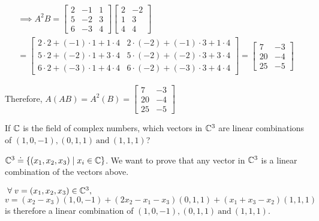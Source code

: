 \documentclass[a4paper, 11pt]{article}
\begin{document}
\begin{solution}
    \begin{multline*}
        \implies A^2B = \left[\begin{array}{ccc}
                2 & -1 & 1 \\
                5 & -2 & 3 \\
                6 & -3 & 4
            \end{array}\right]\left[\begin{array}{cc}
                2 & -2 \\
                1 & 3  \\
                4 & 4
            \end{array}\right]
        \\
        = \left[\begin{array}{cc}
                2 \cdot 2 + (-1) \cdot 1 + 1 \cdot 4 & 2 \cdot (-2) + (-1) \cdot 3 + 1 \cdot 4 \\
                5 \cdot 2 + (-2) \cdot 1 + 3 \cdot 4 & 5 \cdot (-2) + (-2) \cdot 3 + 3 \cdot 4 \\
                6 \cdot 2 + (-3) \cdot 1 + 4 \cdot 4 & 6 \cdot (-2) + (-3) \cdot 3 + 4 \cdot 4
            \end{array}\right]
        = \left[\begin{array}{cc}
                7  & -3 \\
                20 & -4 \\
                25 & -5
            \end{array}\right]
    \end{multline*}

    Therefore, \(A(AB) = A^2(B) = \left[\begin{array}{cc}
            7  & -3 \\
            20 & -4 \\
            25 & -5
        \end{array}\right]\)
\end{solution}
\begin{problem} 
If \(\mathbb{C}\) is the field of complex numbers, which vectors in \(\mathbb{C}^3\) are linear combinations of \((1, 0, -1), (0, 1, 1) \:\text{and}\: (1, 1, 1)\)?
\end{problem}
\begin{solution}
    \(\mathbb{C}^3 \doteq \{(x_1, x_2, x_3) \mid x_i \in \mathbb{C}\}\). We want to prove that any vector in \(\mathbb{C}^3\) is a linear combination of the vectors above.

    \(\forall v = (x_1, x_2, x_3) \in \bbc^3, \)
    \[
        v = (x_2-x_3)(1, 0, -1) + (2x_2 - x_1 - x_3)(0, 1, 1) + (x_1+x_3-x_2)(1,1,1)
    \]
    is therefore a linear combination of \((1, 0, -1), (0, 1, 1) \:\text{and}\: (1, 1, 1)\).
\end{solution}
\end{document}
